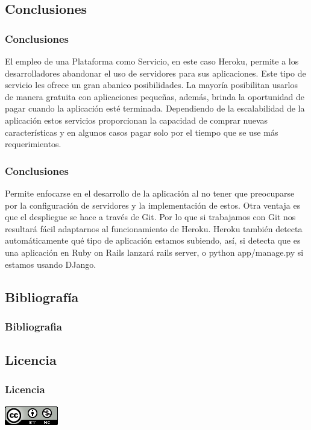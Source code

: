 \documentclass{beamer}
\begin{document}
\subsection{Conclusiones}
\begin{frame}
\frametitle{Conclusiones}
El empleo de una Plataforma como Servicio, en este caso Heroku, permite a los desarrolladores abandonar el uso de servidores para sus aplicaciones. Este tipo de servicio les ofrece un gran abanico posibilidades. La mayoría posibilitan usarlos de manera gratuita con aplicaciones pequeñas, además, brinda la oportunidad de pagar cuando la aplicación esté terminada. Dependiendo de la escalabilidad de la aplicación estos servicios proporcionan la capacidad de comprar nuevas características y en algunos casos pagar solo por el tiempo que se use más requerimientos.

\end{frame}

\begin{frame}
\frametitle{Conclusiones}
Permite enfocarse en el desarrollo de la aplicación al no tener que preocuparse por la configuración de servidores y la implementación de estos. Otra ventaja es que el despliegue se hace a través de Git. Por lo que si trabajamos con Git nos resultará fácil adaptarnos al funcionamiento de Heroku. Heroku también detecta automáticamente qué tipo de aplicación estamos subiendo, así, si detecta que es una aplicación en Ruby on Rails lanzará rails server, o python app/manage.py si estamos usando DJango.
\end{frame}


\subsection{Bibliografía}
\begin{frame}
\frametitle{Bibliografia}


\end{frame}

\subsection{Licencia}
\begin{frame}
\frametitle{Licencia}
\begin{center}
\href{http://creativecommons.org/licenses/by-nc/4.0/}{\includegraphics[scale=.8]{cc}}
\end{center}
\end{frame}

\MuchasGraciasFrame
\end{document}
